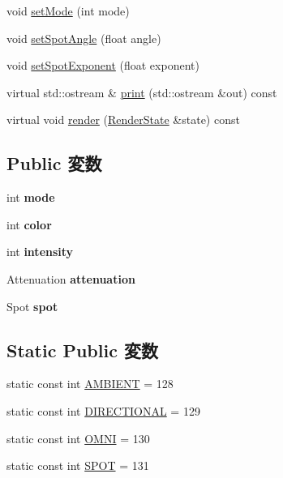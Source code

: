 \begin{CompactItemize}
\item 
void \hyperlink{classm3g_1_1Light_9f407b18ba6235cb96fa95611c1ea3a4}{setMode} (int mode)
\item 
void \hyperlink{classm3g_1_1Light_30ce206b37f6ed5e918fbc75b3f91072}{setSpotAngle} (float angle)
\item 
void \hyperlink{classm3g_1_1Light_787eb66801e17d0412559598326ce19d}{setSpotExponent} (float exponent)
\item 
virtual std::ostream \& \hyperlink{classm3g_1_1Light_6fea17fa1532df3794f8cb39cb4f911f}{print} (std::ostream \&out) const 
\item 
virtual void \hyperlink{classm3g_1_1Light_8babc8a79b78615da51161e94029eea9}{render} (\hyperlink{structm3g_1_1RenderState}{RenderState} \&state) const 
\end{CompactItemize}
\subsection*{Public 変数}
\begin{CompactItemize}
\item 
\hypertarget{classm3g_1_1Light_1ea5d0cb93f22f7d0fdf804bd68c3326}{
int \textbf{mode}}
\label{classm3g_1_1Light_1ea5d0cb93f22f7d0fdf804bd68c3326}

\item 
\hypertarget{classm3g_1_1Light_0fd02fb9277ffcb35a75066ffe95e8c7}{
int \textbf{color}}
\label{classm3g_1_1Light_0fd02fb9277ffcb35a75066ffe95e8c7}

\item 
\hypertarget{classm3g_1_1Light_299ec0c42ccc5a2d79d1739428ac3210}{
int \textbf{intensity}}
\label{classm3g_1_1Light_299ec0c42ccc5a2d79d1739428ac3210}

\item 
\hypertarget{classm3g_1_1Light_1569207c73e72f9b3ceeaba71b985378}{
Attenuation \textbf{attenuation}}
\label{classm3g_1_1Light_1569207c73e72f9b3ceeaba71b985378}

\item 
\hypertarget{classm3g_1_1Light_8c48692471265603559309c9b2fd65a1}{
Spot \textbf{spot}}
\label{classm3g_1_1Light_8c48692471265603559309c9b2fd65a1}

\end{CompactItemize}
\subsection*{Static Public 変数}
\begin{CompactItemize}
\item 
static const int \hyperlink{classm3g_1_1Light_4cf648a82d9de62a1fb15f4277049594}{AMBIENT} = 128
\item 
static const int \hyperlink{classm3g_1_1Light_a2fb668ca8bbeb8323eda98fba594fda}{DIRECTIONAL} = 129
\item 
static const int \hyperlink{classm3g_1_1Light_34d360bb8395ad7fbcd3ec286ece64cb}{OMNI} = 130
\item 
static const int \hyperlink{classm3g_1_1Light_c44aef16b96dc8fd8b134416964a7de9}{SPOT} = 131
\end{CompactItemize}


